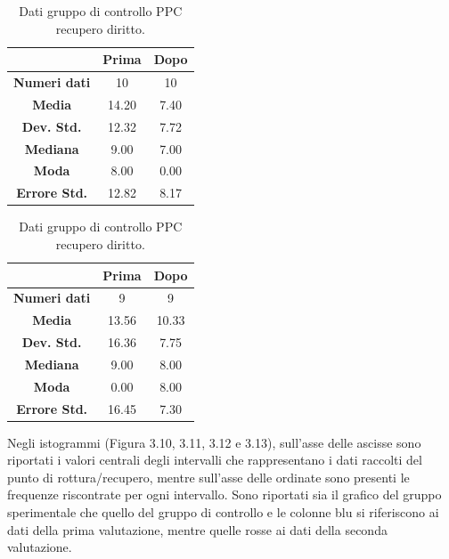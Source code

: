 \begin{table}
\begin{minipage}{0.48\textwidth}
\begin{tabular}{|c|c|c|} \hline
{\textbf{}} & {\textbf{  \hspace{8pt}Prima\hspace{8pt} }} & {\textbf{ \hspace{8pt}Dopo\hspace{8pt}  }}\\ \hline
\textbf{Numeri dati} & 10 & 10 \\
\textbf{Media} & 14.20 & 7.40 \\  
\textbf{Dev. Std.} & 12.32 & 7.72 \\ 
\textbf{Mediana} & 9.00 & 7.00 \\ 
\textbf{Moda} & 8.00 & 0.00 \\ 
\textbf{Errore Std.}& 12.82 & 8.17 \\ 
\hline
\end{tabular}
\caption{Dati gruppo sperimentale PPC recupero diritto.}

\label{tab:accuracy} 
\end{minipage}%
\hfill
\begin{minipage}{0.48\textwidth}
\centering

\begin{tabular}{|c|c|c|} \hline
{\textbf{}} & {\textbf{  \hspace{8pt}Prima\hspace{8pt} }} & {\textbf{ \hspace{8pt}Dopo\hspace{8pt}  }}\\ \hline
\textbf{Numeri dati} & 9 & 9 \\ 
\textbf{Media} & 13.56 & 10.33 \\  
\textbf{Dev. Std.} & 16.36 & 7.75 \\  
\textbf{Mediana} & 9.00 & 8.00 \\ 
\textbf{Moda} & 0.00 & 8.00 \\ 
\textbf{Errore Std.} & 16.45 & 7.30\\ 
\hline
\end{tabular}
\caption{Dati gruppo di controllo PPC recupero diritto.}

 \label{tab:ompdiff} 
\end{minipage}
\end{table}
Negli istogrammi (Figura 3.10, 3.11, 3.12 e 3.13), sull’asse delle ascisse sono riportati i valori centrali degli intervalli che rappresentano i dati raccolti del punto di rottura/recupero, mentre sull’asse delle ordinate sono presenti le frequenze riscontrate per ogni intervallo. Sono riportati sia il grafico del gruppo sperimentale che quello del gruppo di controllo e le colonne blu si riferiscono ai dati della prima valutazione, mentre quelle rosse ai dati della seconda valutazione.

